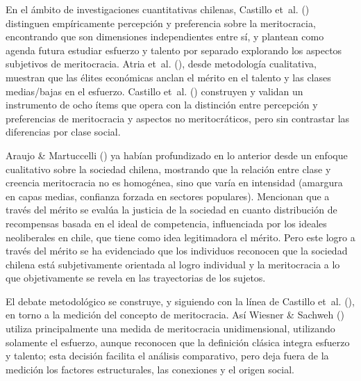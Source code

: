 \documentclass[
  spanish,
  a4paper,
  oneside]{scrbook}
\begin{document}
En el ámbito de investigaciones cuantitativas chilenas, Castillo et~al.
() distinguen
empíricamente percepción y preferencia sobre la meritocracia,
encontrando que son dimensiones independientes entre sí, y plantean como
agenda futura estudiar esfuerzo y talento por separado explorando los
aspectos subjetivos de meritocracia. Atria et~al.
(), desde metodología
cualitativa, muestran que las élites económicas anclan el mérito en el
talento y las clases medias/bajas en el esfuerzo. Castillo et~al.
() construyen y
validan un instrumento de ocho ítems que opera con la distinción entre
percepción y preferencias de meritocracia y aspectos no meritocráticos,
pero sin contrastar las diferencias por clase social.

Araujo \& Martuccelli () ya
habían profundizado en lo anterior desde un enfoque cualitativo sobre la
sociedad chilena, mostrando que la relación entre clase y creencia
meritocracia no es homogénea, sino que varía en intensidad (amargura en
capas medias, confianza forzada en sectores populares). Mencionan que a
través del mérito se evalúa la justicia de la sociedad en cuanto
distribución de recompensas basada en el ideal de competencia,
influenciada por los ideales neoliberales en chile, que tiene como idea
legitimadora el mérito. Pero este logro a través del mérito se ha
evidenciado que los individuos reconocen que la sociedad chilena está
subjetivamente orientada al logro individual y la meritocracia a lo que
objetivamente se revela en las trayectorias de los sujetos.

El debate metodológico se construye, y siguiendo con la línea de
Castillo et~al. (),
en torno a la medición del concepto de meritocracia. Así Wiesner \&
Sachweh () utiliza principalmente
una medida de meritocracia unidimensional, utilizando solamente el
esfuerzo, aunque reconocen que la definición clásica integra esfuerzo y
talento; esta decisión facilita el análisis comparativo, pero deja fuera
de la medición los factores estructurales, las conexiones y el origen
social.
\end{document}
